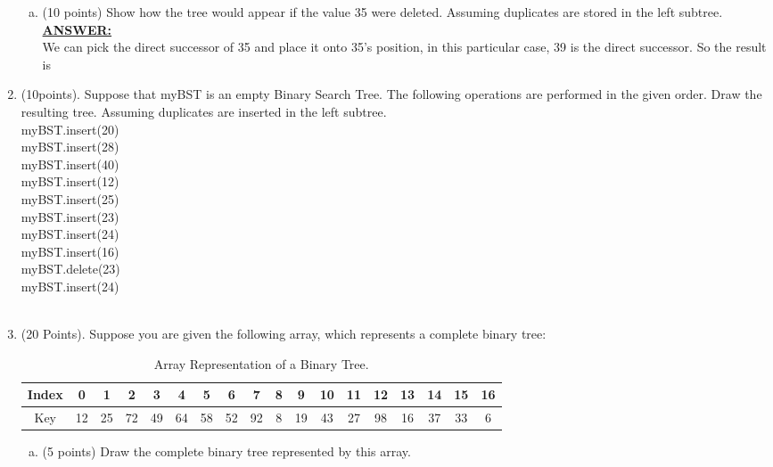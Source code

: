 \documentclass{article}
\newcommand{\answer}{\textbf{\\\underline{ANSWER:}\\}}
\begin{document}
\begin{enumerate}
\begin{enumerate}[(a)]
\item (10 points)  Show how the tree would appear if the value 35 were
deleted. Assuming duplicates are stored in the left subtree. 
\answer We can pick the direct successor of 35 and place it onto 35's
position, in this particular case, 39 is the direct successor. So the
result is 

\end{enumerate}

\item(10points). Suppose that myBST is an empty Binary Search Tree. The
following operations are performed in the given order. Draw the
resulting tree.  Assuming duplicates are inserted in the left subtree. \\
myBST.insert(20) \\
myBST.insert(28) \\
myBST.insert(40) \\
myBST.insert(12) \\
myBST.insert(25) \\
myBST.insert(23) \\
myBST.insert(24) \\
myBST.insert(16) \\
myBST.delete(23) \\
myBST.insert(24) \\
 \\


\item(20 Points). Suppose you are given the following array, which
represents a complete binary tree:
\begin{table}[h]
  \begin{center}
    \begin{tabular}{|c|c|c|c|c|c|c|c|c|c|c|c|c|c|c|c|c|c|} 
      \hline Index &0&1&2&3&4&5&6&7&8&9&10&11&12&13&14&15&16 \\
      \hline Key&12&25&72&49&64&58&52&92&8&19&43&27&98&16&37&33&6\\
      \hline
    \end{tabular}
    \caption{Array Representation of a Binary Tree.} 
    \vspace{-15pt}
  \end{center}
\end{table}
\begin{enumerate}[(a)]
\item (5 points) Draw the complete binary tree represented by this array. 
 \\



\end{enumerate}
\end{enumerate}
\end{document}
